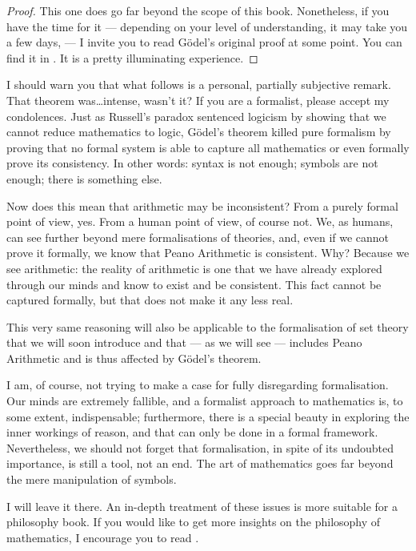 \begin{proof}
This one does go far beyond the scope of this book. Nonetheless, if you have the time for it --- depending on your level of understanding, it may take you a few days, --- I invite you to read G\"odel's original proof at some point. You can find it in \cite{Godel}. It is a pretty illuminating experience.
\end{proof}

\begin{para}
I should warn you that what follows is a personal, partially subjective remark. That theorem was\ldots intense, wasn't it? If you are a formalist, please accept my condolences.
Just as Russell's paradox sentenced logicism by showing that we cannot reduce mathematics to logic, G\"odel's theorem killed pure formalism by proving that no formal system is able to capture all mathematics or even formally prove its consistency. In other words: syntax is not enough; symbols are not enough; there is something else.

Now does this mean that arithmetic may be inconsistent? 
From a purely formal point of view, yes.
From a human point of view, of course not.
We, as humans, can see further beyond mere formalisations of theories, and, even if we cannot prove it formally, we know that Peano Arithmetic is consistent.
Why? Because we see arithmetic: the reality of arithmetic is one that we have already explored through our minds and know to exist and be consistent.
This fact cannot be captured formally, but that does not make it any less real.

This very same reasoning will also be applicable to the formalisation of set theory that we will soon introduce and that --- as we will see --- includes Peano Arithmetic and is thus affected by G\"odel's theorem.

I am, of course, not trying to make a case for fully disregarding formalisation.
Our minds are extremely fallible, and a formalist approach to mathematics is, to some extent, indispensable;
furthermore, there is a special beauty in exploring the inner workings of reason, and that can only be done in a formal framework.
Nevertheless, we should not forget that formalisation, in spite of its undoubted importance, is still a tool, not an end.
The art of mathematics goes far beyond the mere manipulation of symbols.

I will leave it there. An in-depth treatment of these issues is more suitable for a philosophy book.
If you would like to get more insights on the philosophy of mathematics, I encourage you to read \cite{Brown}.
\end{para}
